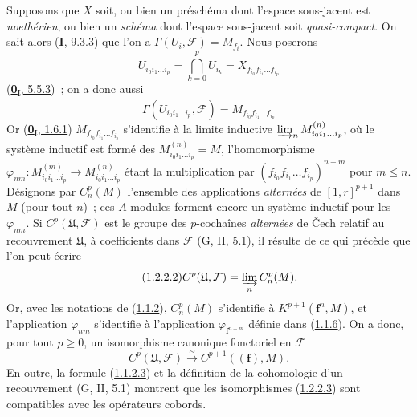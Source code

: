 \begin{env}[1.2.2]
\label{III.1.2.2-fr}
Supposons que $X$ soit, ou bien un préschéma dont l'espace sous-jacent est
\emph{noethérien}, ou bien un \emph{schéma} dont l'espace sous-jacent soit
\emph{quasi-compact}. On sait alors (\hyperref[I.9.3.3-fr]{\textbf{I}, 9.3.3}) que
l'on a $\Gamma(U_i,\mathcal F)=M_{f_i}$. Nous poserons
\[
U_{i_0i_1\ldots i_p}=\bigcap_{k=0}^p U_{i_k}
=X_{f_{i_0}f_{i_1}\ldots f_{i_p}}
\]
(\hyperref[0.5.5.3-fr]{\textbf{0}\textsubscript{I}, 5.5.3})~; on a donc aussi
\begin{equation}
\label{III.1.2.2.1-fr}
\tag{1.2.2.1}
\Gamma(U_{i_0i_1\ldots i_p},\mathcal F)=M_{f_{i_0}f_{i_1}\ldots f_{i_p}}
\end{equation}
Or (\hyperref[0.1.6.1-fr]{\textbf{0}\textsubscript{I}, 1.6.1})
$M_{f_{i_0}f_{i_1}\ldots f_{i_p}}$ s'identifie à la limite inductive
$\varinjlim_n M_{i_0i_1\ldots i_p}^{(n)}$, où le système inductif est formé
des $M_{i_0i_1\ldots i_p}^{(n)}=M$, l'homomorphisme
$\varphi_{nm}:M_{i_0i_1\ldots i_p}^{(m)}\to
M_{i_0i_1\ldots i_p}^{(n)}$ étant la multiplication par
$(f_{i_0}f_{i_1}\ldots f_{i_p})^{n-m}$ pour $m\leq n$. Désignons par
$C_n^p(M)$ l'ensemble des applications \emph{alternées} de $[1,r]^{p+1}$
dans $M$ (pour tout $n$)~; ces $A$-modules forment encore un système inductif
pour les $\varphi_{nm}$. Si $C^p(\mathfrak U,\mathcal F)$ est le groupe des
$p$-cochaînes \emph{alternées} de Čech relatif au recouvrement $\mathfrak U$,
à coefficients dans $\mathcal F$ (G, II, 5.1), il résulte de ce qui précède
que l'on peut écrire
\begin{equation}
\label{III.1.2.2.2-fr}
\tag{1.2.2.2}
C^p(\mathfrak U,\mathcal F)=\varinjlim_n C_n^p(M).
\end{equation}
Or, avec les notations de (\hyperref[III.1.1.2-fr]{1.1.2}), $C_n^p(M)$
s'identifie à $K^{p+1}(\mathbf f^n,M)$, et l'application $\varphi_{nm}$
s'identifie à l'application $\varphi_{\mathbf f^{n-m}}$ définie dans
(\hyperref[III.1.1.6-fr]{1.1.6}). On a donc, pour tout $p\geq0$, un
isomorphisme canonique fonctoriel en $\mathcal F$
\begin{equation}
\label{III.1.2.2.3-fr}
\tag{1.2.2.3}
C^p(\mathfrak U,\mathcal F)\xrightarrow{\sim}C^{p+1}((\mathbf f),M).
\end{equation}
En outre, la formule (\hyperref[III.1.1.2.3-fr]{1.1.2.3}) et la définition de
la cohomologie d'un recouvrement (G, II, 5.1) montrent que les isomorphismes
(\hyperref[III.1.2.2.3-fr]{1.2.2.3}) sont compatibles avec les opérateurs
cobords.
\end{env}

